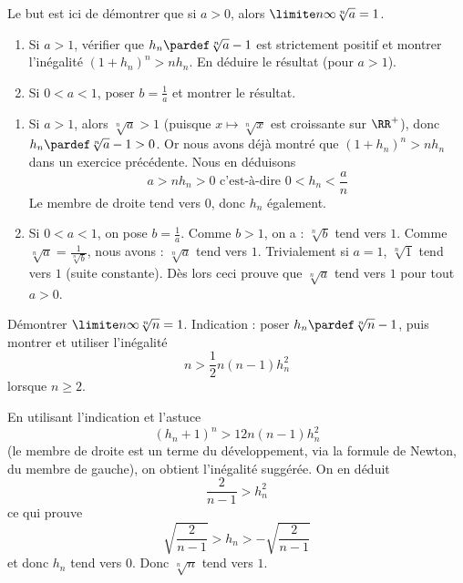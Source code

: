 \documentclass[12pt,french,oneside,a4paper]{memoir} %
\begin{document}
\begin{exo}
Le but est ici de démontrer que si $a > 0$, alors $\limite n \infty \sqrt[n]{a} = 1$.%
\begin{enumerate}
\item Si $a > 1$, vérifier que $h_{n} \pardef \sqrt[n]{a} - 1$ est strictement positif et montrer l'inégalité $(1+h_{n})^{n} > n h_{n}$. En déduire le résultat (pour $a > 1$).
\item Si $0 < a < 1$, poser $b = \frac 1a$ et montrer le résultat.
\end{enumerate}
\begin{correction}
  \begin{enumerate}
  \item Si $a > 1$, alors $\sqrt[n]{a} > 1$ (puisque $x \mapsto \sqrt[n]{x}$ est croissante sur $\RR^{+}$), donc $h_{n} \pardef \sqrt[n]{a} - 1 > 0$. Or nous avons déjà montré que $(1+h_{n})^{n} > n h_{n}$ dans un exercice précédente. Nous en déduisons
    \begin{equation*}
      a > n h_{n} > 0 \text{ c'est-à-dire }  0 < h_{n} < \frac a n
    \end{equation*}
    Le membre de droite tend vers $0$, donc $h_{n}$ également.
  \item Si $0 < a < 1$, on pose $b = \frac 1a$. Comme $b > 1$, on a : $\sqrt[n]b$ tend vers $1$. Comme $\sqrt[n]a = \frac{1}{\sqrt[n]{b}}$, nous avons : $\sqrt[n]{a}$ tend vers $1$. Trivialement si $a = 1$, $\sqrt[n]{1}$ tend vers $1$ (suite constante). Dès lors ceci prouve que $\sqrt[n] a$ tend vers $1$ pour tout $a > 0$.
  \end{enumerate}
\end{correction}
\end{exo}
\begin{exo}
Démontrer $\limite n \infty \sqrt[n]{n} = 1$. Indication : poser $h_{n} \pardef \sqrt[n]{n} - 1$, puis montrer et utiliser l'inégalité
\begin{equation*}
  n > \frac 12 n (n-1) h_{n}^{2}
\end{equation*}
lorsque $n \geq 2$.

\begin{correction}
  En utilisant l'indication et l'astuce
  \begin{equation*}
    (h_{n} + 1)^{n} > 12 n (n-1) h_{n}^{2}
  \end{equation*}
  (le membre de droite est un terme du développement, via la formule de Newton, du membre de gauche), on obtient l'inégalité suggérée. On en déduit
  \begin{equation*}
    \frac{2}{n-1} > h_{n}^{2}
  \end{equation*}
  ce qui prouve
  \begin{equation*}
    \sqrt{\frac{2}{n-1}} > h_{n} > -\sqrt{\frac{2}{n-1}}
  \end{equation*}
  et donc $h_{n}$ tend vers $0$. Donc $\sqrt[n]n$ tend vers $1$.
\end{correction}
\end{exo}
\end{document}
